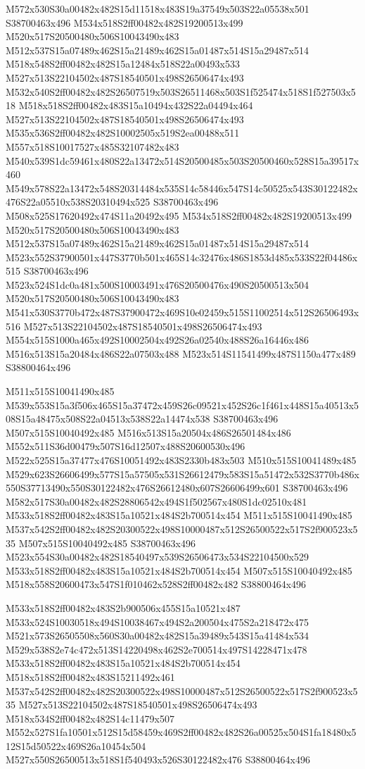 \documentclass{article}
\begin{document}
\begin{multicols}{2}
M572x530S30a00482x482S15d11518x483S19a37549x503S22a05538x501 S38700463x496 M534x518S2ff00482x482S19200513x499 M520x517S20500480x506S10043490x483 M512x537S15a07489x462S15a21489x462S15a01487x514S15a29487x514 M518x548S2ff00482x482S15a12484x518S22a00493x533 M527x513S22104502x487S18540501x498S26506474x493 M532x540S2ff00482x482S26507519x503S26511468x503S1f525474x518S1f527503x518 M518x518S2ff00482x483S15a10494x432S22a04494x464 M527x513S22104502x487S18540501x498S26506474x493 M535x536S2ff00482x482S10002505x519S2ea00488x511 M557x518S10017527x485S32107482x483 M540x539S1dc59461x480S22a13472x514S20500485x503S20500460x528S15a39517x460 M549x578S22a13472x548S20314484x535S14c58446x547S14c50525x543S30122482x476S22a05510x538S20310494x525 S38700463x496 M508x525S17620492x474S11a20492x495 M534x518S2ff00482x482S19200513x499 M520x517S20500480x506S10043490x483 M512x537S15a07489x462S15a21489x462S15a01487x514S15a29487x514 M523x552S37900501x447S3770b501x465S14c32476x486S1853d485x533S22f04486x515 S38700463x496 M523x524S1dc0a481x500S10003491x476S20500476x490S20500513x504 M520x517S20500480x506S10043490x483 M541x530S3770b472x487S37900472x469S10e02459x515S11002514x512S26506493x516 M527x513S22104502x487S18540501x498S26506474x493 M554x515S1000a465x492S10002504x492S26a02540x488S26a16446x486 M516x513S15a20484x486S22a07503x488 M523x514S11541499x487S1150a477x489 S38800464x496

M511x515S10041490x485 M539x553S15a3f506x465S15a37472x459S26c09521x452S26c1f461x448S15a40513x508S15a48475x508S22a04513x538S22a14474x538 S38700463x496 M507x515S10040492x485 M516x513S15a20504x486S26501484x486 M552x511S36d00479x507S16d12507x488S20600530x496 M522x525S15a37477x476S10051492x483S2330b483x503 M510x515S10041489x485 M529x623S26606499x577S15a57505x531S26612479x583S15a51472x532S3770b486x550S37713490x550S30122482x476S26612480x607S26606499x601 S38700463x496 M582x517S30a00482x482S28806542x494S1f502567x480S1dc02510x481 M533x518S2ff00482x483S15a10521x484S2b700514x454 M511x515S10041490x485 M537x542S2ff00482x482S20300522x498S10000487x512S26500522x517S2f900523x535 M507x515S10040492x485 S38700463x496 M523x554S30a00482x482S18540497x539S26506473x534S22104500x529 M533x518S2ff00482x483S15a10521x484S2b700514x454 M507x515S10040492x485 M518x558S20600473x547S1f010462x528S2ff00482x482 S38800464x496

M533x518S2ff00482x483S2b900506x455S15a10521x487 M533x524S10030518x494S10038467x494S2a200504x475S2a218472x475 M521x573S26505508x560S30a00482x482S15a39489x543S15a41484x534 M529x538S2e74c472x513S14220498x462S2e700514x497S14228471x478 M533x518S2ff00482x483S15a10521x484S2b700514x454 M518x518S2ff00482x483S15211492x461 M537x542S2ff00482x482S20300522x498S10000487x512S26500522x517S2f900523x535 M527x513S22104502x487S18540501x498S26506474x493 M518x534S2ff00482x482S14c11479x507 M552x527S1fa10501x512S15d58459x469S2ff00482x482S26a00525x504S1fa18480x512S15d50522x469S26a10454x504 M527x550S26500513x518S1f540493x526S30122482x476 S38800464x496


\end{multicols}
\end{document}
